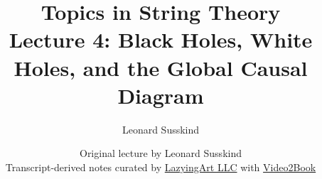 \documentclass[11pt,oneside]{book}
\begin{document}
\frontmatter
\title{Topics in String Theory\\[0.5em]
\large Lecture 4: Black Holes, White Holes, and the Global Causal Diagram}
\author{Leonard Susskind}
\date{Original lecture by Leonard Susskind\\[0.4em]
Transcript-derived notes curated by
\href{https://lazying.art}{LazyingArt LLC} with
\href{https://github.com/lachlanchen/Video2Book}{Video2Book}}
\maketitle
\mainmatter

\end{document}
